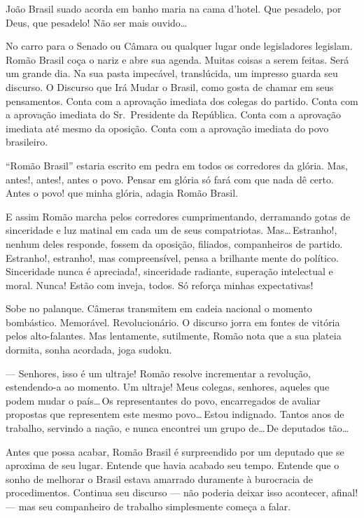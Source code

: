João Brasil suado acorda em banho maria na cama d'hotel. Que pesadelo, por Deus, que pesadelo! Não ser mais ouvido\ldots



No carro para o Senado ou Câmara ou qualquer lugar onde legisladores legislam. Romão Brasil coça o nariz e abre sua agenda. Muitas coisas a serem feitas. Será um grande dia. Na sua pasta impecável, translúcida, um impresso guarda seu discurso. O Discurso que Irá Mudar o Brasil, como gosta de chamar em seus pensamentos. Conta com a aprovação imediata dos colegas do partido. Conta com a aprovação imediata do Sr.~Presidente da República. Conta com a aprovação imediata até mesmo da oposição. Conta com a aprovação imediata do povo brasileiro.

``Romão Brasil'' estaria escrito em pedra em todos os corredores da glória. Mas, antes!, antes!, antes o povo. Pensar em glória só fará com que nada dê certo. Antes o povo! que minha glória, adagia Romão Brasil.

E assim Romão marcha pelos corredores cumprimentando, derramando gotas de sinceridade e luz matinal em cada um de seus compatriotas. Mas\ldots\,Estranho!, nenhum deles responde, fossem da oposição, filiados, companheiros de partido. Estranho!, estranho!, mas compreensível, pensa a brilhante mente do político. Sinceridade nunca é apreciada!, sinceridade radiante, superação intelectual e moral. Nunca! Estão com inveja, todos. Só reforça minhas expectativas!

Sobe no palanque. Câmeras transmitem em cadeia nacional o momento bombástico. Memorável. Revolucionário. O discurso jorra em fontes de vitória pelos alto-falantes. Mas lentamente, sutilmente, Romão nota que a sua plateia dormita, sonha acordada, joga sudoku.

\begin{sloppypar}
--- Senhores, isso é um ultraje! Romão resolve incrementar a revolução, estendendo-a ao momento. Um ultraje! Meus colegas, senhores, aqueles que podem mudar o país\ldots\,Os representantes do povo, encarregados de avaliar propostas que representem este mesmo povo\ldots\,Estou indignado. Tantos anos de trabalho, servindo a nação, e nunca encontrei um grupo de\ldots\,De deputados tão\ldots
\end{sloppypar}

Antes que possa acabar, Romão Brasil é surpreendido por um deputado que se aproxima de seu lugar. Entende que havia acabado seu tempo. Entende que o sonho de melhorar o Brasil estava amarrado duramente à burocracia de procedimentos. Continua seu discurso --- não poderia deixar isso acontecer, afinal! --- mas seu companheiro de trabalho simplesmente começa a falar.

